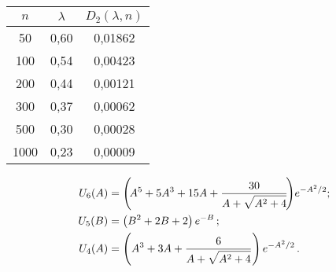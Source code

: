 \begin{multicols}{2}
\begin{center}
\vspace*{2ex}
\tabcolsep=14.6pt
{\small
\begin{tabular}{|c|c|c|}
\hline
$n$   & $\lambda$& $D_2(\lambda,n)$\\
\hline
\hphantom{9}50 &0,60 & 0,01862\\
100  & 0,54& 0,00423\\
200  & 0,44 & 0,00121\\
300&   0,37 & 0,00062\\
500&  0,30 & 0,00028\\
1000\hphantom{9} & 0,23 & 0,00009\\
\hline 
\end{tabular}}
\end{center}
\vspace*{9pt}

\smallskip
\addtocounter{table}{1}

\noindent
  \begin{align*}
  U_6(A)&= \Bigg(\!A^5+5A^3+ 15A + \displaystyle\frac{\displaystyle 30\mathstrut}{\displaystyle A+\sqrt{A^2+4}\mathstrut}\!\Bigg)e^{-A^2/2};\\
U_5(B)& = \left(B^2+2B+2\right)e^{-B}\,;\\
U_4(A)&= \left(A^3+ 3A + \displaystyle\frac{\displaystyle 6\mathstrut}{\displaystyle A+\sqrt{A^2+4}\mathstrut}\right)e^{-A^2/2} \,.
\end{align*}






\end{multicols}
